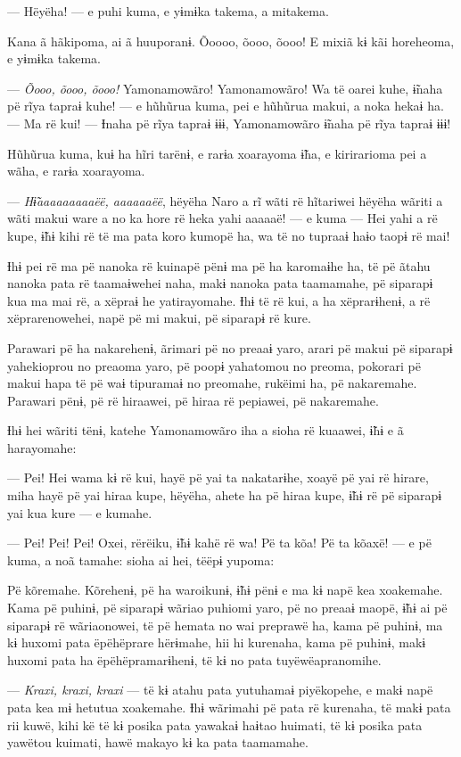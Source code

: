 --- Hëyëha! --- e puhi kuma, e yɨmɨka takema, a mitakema. 

Kana ã hãkipoma, ai ã huuporanɨ. Õoooo, õooo, õooo! E mixiã kɨ kãi
horeheoma, e yɨmɨka takema. 

--- \textit{Õooo, õooo, õooo!} Yamonamowãro! Yamonamowãro! Wa të oarei kuhe,
ɨ̃naha pë rĩya tapraɨ kuhe! --- e hũhũrua kuma, pei e hũhũrua makui, a
noka hekaɨ ha. --- Ma rë kui! --- Ɨnaha pë rĩya tapraɨ ɨɨɨ, Yamonamowãro
ɨ̃naha pë rĩya tapraɨ ɨɨɨ! 

Hũhũrua kuma, kuɨ ha hĩri tarënɨ, e rarɨa xoarayoma ɨ̃ha, e kirirarioma
pei a wãha, e rarɨa xoarayoma. 

--- \textit{Hɨ̃aaaaaaaaaëë, aaaaaaëë}, hëyëha Naro a rĩ wãti rë hĩtariwei hëyëha
wãriti a wãti makui ware a no ka hore rë heka yahi aaaaaë! --- e kuma
--- Hei yahi a rë kupe, ɨ̃hɨ kihi rë të ma pata koro kumopë ha, wa të no
tupraaɨ haɨo taopɨ rë mai! 

Ɨhɨ pei rë ma pë nanoka rë kuinapë pënɨ ma pë ha karomaɨhe ha, të pë
ãtahu nanoka pata rë taamaɨwehei naha, makɨ nanoka pata taamamahe, pë
siparapɨ kua ma mai rë, a xëpraɨ he yatirayomahe. Ɨhɨ të rë kui, a ha
xëprarɨhenɨ, a rë xëprarenowehei, napë pë mi makui, pë siparapɨ rë
kure. 

Parawari pë ha nakarehenɨ, ãrimari pë no preaaɨ yaro, arari pë makui pë
siparapɨ yahekioprou no preaoma yaro, pë poopɨ yahatomou no preoma,
pokorari pë makui hapa të pë waɨ tipuramaɨ no preomahe, rukëimi ha, pë
nakaremahe. Parawari pënɨ, pë rë hiraawei, pë hiraa rë pepiawei, pë
nakaremahe. 

Ɨhɨ hei wãriti tënɨ, katehe Yamonamowãro iha a sioha rë kuaawei, ɨ̃hɨ e ã
harayomahe: 

--- Pei! Hei wama kɨ rë kui, hayë pë yai ta nakatarɨhe, xoayë pë yai rë
hirare, miha hayë pë yai hiraa kupe, hëyëha, ahete ha pë hiraa kupe, ɨ̃hɨ
rë pë siparapɨ yai kua kure --- e kumahe. 

--- Pei! Pei! Pei! Oxei, rërëiku, ɨ̃hɨ kahë rë wa! Pë ta kõa! Pë ta
kõaxë! --- e pë kuma, a noã tamahe: sioha ai hei, tëëpɨ yupoma: 

Pë kõremahe. Kõrehenɨ, pë ha waroikunɨ, ɨ̃hɨ pënɨ e ma kɨ napë kea
xoakemahe. Kama pë puhinɨ, pë siparapɨ wãriao puhiomi yaro, pë no preaaɨ
maopë, ɨ̃hɨ ai pë siparapɨ rë wãriaonowei, të pë hemata no wai preprawë
ha, kama pë puhinɨ, ma kɨ huxomi pata ëpëhëprare hërɨmahe, hii hi
kurenaha, kama pë puhinɨ, makɨ huxomi pata ha ëpëhëpramarɨhenɨ, të kɨ no
pata tuyëwëapranomihe. 

--- \textit{Kraxi, kraxi, kraxi} --- të kɨ atahu pata yutuhamaɨ piyëkopehe, e
makɨ napë pata kea mɨ hetutua xoakemahe. Ɨhɨ wãrimahi pë pata rë
kurenaha, të makɨ pata rii kuwë, kihi kë të kɨ posika pata yawakaɨ
haɨtao huimati, të kɨ posika pata yawëtou kuimati, hawë makayo kɨ ka
pata taamamahe. 


